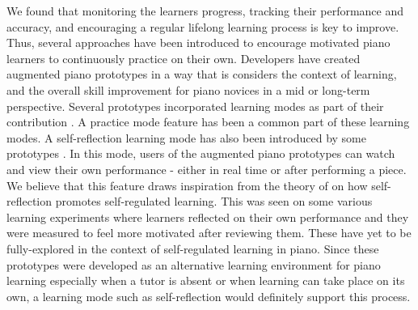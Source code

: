 \documentclass[sigconf, screen, review]{acmart}
\begin{document}
We found that monitoring the learners progress, tracking their performance and accuracy, and encouraging a regular lifelong learning process is key to improve. Thus, several approaches have been introduced to encourage motivated piano learners to continuously practice on their own. Developers have created augmented piano prototypes in a way that is considers the context of learning, and the overall skill improvement for piano novices in a mid or long-term perspective. Several prototypes incorporated learning modes as part of their contribution \cite{xiao2011duet, das2017music, molloy2019mixed, xu20195}. A practice mode feature has been a common part of these learning modes. A self-reflection learning mode has also been introduced by some prototypes \cite{gerry2019adept, xu20195, xiao2013mirrorfugue}. In this mode, users of the augmented piano prototypes can watch and view their own performance - either in real time or after performing a piece. We believe that this feature draws inspiration from the theory of \citet{zimmerman2009self} on how self-reflection promotes self-regulated learning. This was seen on some various learning experiments \cite{deja2016discovering,lyons2011monitoring} where learners reflected on their own performance and they were measured to feel more motivated after reviewing them. These have yet to be fully-explored in the context of self-regulated learning in piano.  Since these prototypes were developed as an alternative learning environment for piano learning especially when a tutor is absent or when learning can take place on its own, a learning mode such as self-reflection would definitely support this process. 
\end{document}
